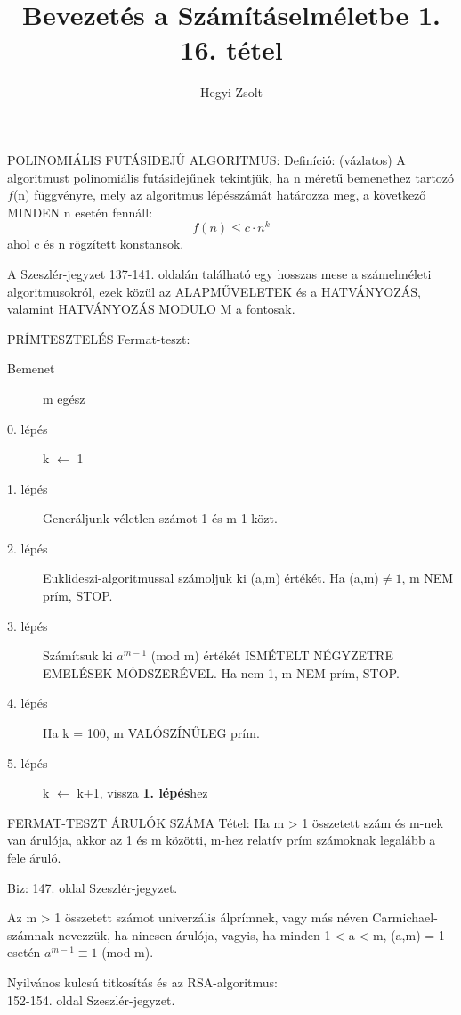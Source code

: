 \documentclass[]{article}
\title{Bevezetés a Számításelméletbe 1.\\{\large 16. tétel}}
\author{Hegyi Zsolt}
\begin{document}
\maketitle{}
\begin{shaded}
POLINOMIÁLIS FUTÁSIDEJŰ ALGORITMUS: Definíció: (vázlatos) A algoritmust polinomiális futásidejűnek tekintjük, ha n méretű bemenethez tartozó $f$(n) függvényre, mely az algoritmus lépésszámát határozza meg, a következő MINDEN n esetén fennáll:
$$f(n) \leq c\cdot n^k$$ ahol c és n rögzített konstansok.
\end{shaded}
A Szeszlér-jegyzet 137-141. oldalán található egy hosszas mese a számelméleti algoritmusokról, ezek közül az ALAPMŰVELETEK és a HATVÁNYOZÁS, valamint HATVÁNYOZÁS MODULO M a fontosak.
\begin{framed}
PRÍMTESZTELÉS Fermat-teszt:
\begin{description}
\item[Bemenet]m egész
\item[0. lépés]k $\leftarrow$ 1
\item[1. lépés]Generáljunk véletlen számot 1 és m-1 közt.
\item[2. lépés]Euklideszi-algoritmussal számoljuk ki (a,m) értékét. Ha (a,m)$\neq1$, m NEM prím, STOP.
\item[3. lépés]Számítsuk ki $a^{m-1}$ (mod m) értékét ISMÉTELT NÉGYZETRE EMELÉSEK MÓDSZERÉVEL. Ha nem 1, m NEM prím, STOP.
\item[4. lépés]Ha k = 100, m VALÓSZÍNŰLEG prím.
\item[5. lépés]k $\leftarrow$ k+1, vissza \textbf{1. lépés}hez
\end{description}
\end{framed}
\begin{framed}
FERMAT-TESZT ÁRULÓK SZÁMA Tétel: Ha m > 1 összetett szám és m-nek van árulója, akkor az 1 és m közötti, m-hez relatív prím számoknak legalább a fele áruló.
\end{framed}
\begin{leftbar}
Biz: 147. oldal Szeszlér-jegyzet.
\end{leftbar}
\begin{shaded}
Az m > 1 összetett számot univerzális álprímnek, vagy más néven Carmichael-számnak nevezzük, ha nincsen árulója, vagyis, ha minden 1 < a < m, (a,m) = 1 esetén $a^{m-1} \equiv 1$ (mod m).
\end{shaded}
Nyilvános kulcsú titkosítás és az RSA-algoritmus:\\
152-154. oldal Szeszlér-jegyzet.
\end{document}
